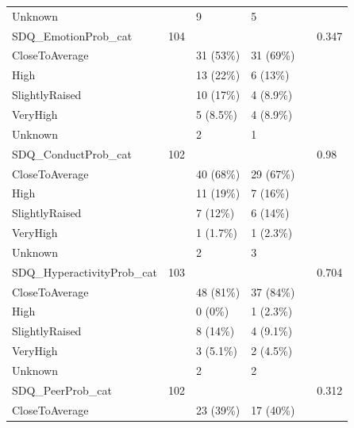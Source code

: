 \documentclass[
]{article}
\begin{document}
\begin{table}[!h]
\begin{tabular}[t]{llllll}
\hspace{1em}Unknown &  & 9 & 5 &  & \\
SDQ\_EmotionProb\_cat & 104 &  &  &  & 0.347\\
\hspace{1em}CloseToAverage &  & 31 (53\%) & 31 (69\%) &  & \\
\addlinespace
\hspace{1em}High &  & 13 (22\%) & 6 (13\%) &  & \\
\hspace{1em}SlightlyRaised &  & 10 (17\%) & 4 (8.9\%) &  & \\
\hspace{1em}VeryHigh &  & 5 (8.5\%) & 4 (8.9\%) &  & \\
\hspace{1em}Unknown &  & 2 & 1 &  & \\
SDQ\_ConductProb\_cat & 102 &  &  &  & 0.98\\
\addlinespace
\hspace{1em}CloseToAverage &  & 40 (68\%) & 29 (67\%) &  & \\
\hspace{1em}High &  & 11 (19\%) & 7 (16\%) &  & \\
\hspace{1em}SlightlyRaised &  & 7 (12\%) & 6 (14\%) &  & \\
\hspace{1em}VeryHigh &  & 1 (1.7\%) & 1 (2.3\%) &  & \\
\hspace{1em}Unknown &  & 2 & 3 &  \vphantom{1} & \\
\addlinespace
SDQ\_HyperactivityProb\_cat & 103 &  &  &  & 0.704\\
\hspace{1em}CloseToAverage &  & 48 (81\%) & 37 (84\%) &  & \\
\hspace{1em}High &  & 0 (0\%) & 1 (2.3\%) &  & \\
\hspace{1em}SlightlyRaised &  & 8 (14\%) & 4 (9.1\%) &  & \\
\hspace{1em}VeryHigh &  & 3 (5.1\%) & 2 (4.5\%) &  & \\
\addlinespace
\hspace{1em}Unknown &  & 2 & 2 &  & \\
SDQ\_PeerProb\_cat & 102 &  &  &  & 0.312\\
\hspace{1em}CloseToAverage &  & 23 (39\%) & 17 (40\%) &  & \\

\end{tabular}
\end{table}
\end{document}
